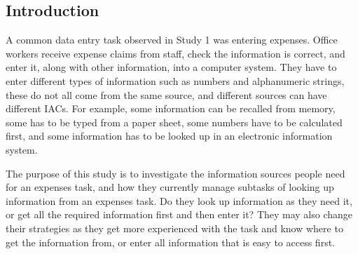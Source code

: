 \documentclass[11pt,oneside]{report}
\begin{document}
\subsection{Introduction}

A common data entry task observed in Study 1 was entering expenses. Office workers receive expense claims from staff, check the information is correct, and enter it, along with other information, into a computer system. They have to enter different types of information such as numbers and alphanumeric strings, these do not all come from the same source, and different sources can have different IACs. For example, some information can be recalled from memory, some has to be typed from a paper sheet, some numbers have to be calculated first, and some information has to be looked up in an electronic information system. 

The purpose of this study is to investigate the information sources people need for an expenses task, and how they currently manage subtasks of looking up information from an expenses task. Do they look up information as they need it, or get all the required information first and then enter it? They may also change their strategies as they get more experienced with the task and know where to get the information from, or enter all information that is easy to access first.
\end{document}
